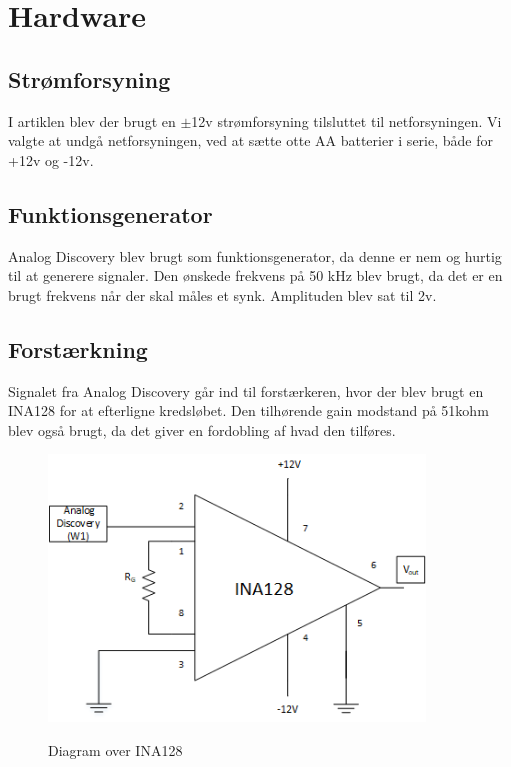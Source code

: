 \documentclass[main.tex]{subfiles}
\begin{document}
\section{Hardware}

\subsection{Strømforsyning}
I artiklen \cite{Aroom2009} blev der brugt en $\pm$12v strømforsyning tilsluttet til netforsyningen. Vi valgte at undgå netforsyningen, ved at sætte otte AA batterier i serie, både for +12v og -12v.


\subsection{Funktionsgenerator}
Analog Discovery blev brugt som funktionsgenerator, da denne er nem og hurtig til at generere signaler. Den ønskede frekvens på 50 kHz blev brugt, da det er en brugt frekvens når der skal måles et synk. Amplituden blev sat til 2v. \cite{Kusuhara2004ImpedanceFunction.}



\subsection{Forstærkning}
Signalet fra Analog Discovery går ind til forstærkeren, hvor der blev brugt en INA128 for at efterligne kredsløbet. Den tilhørende gain modstand på 51kohm blev også brugt, da det giver en fordobling af hvad den tilføres.

\begin{figure}[H]
\centering
{\includegraphics[width=10cm]
{Figure/ina128}}
\caption{Diagram over INA128}
\label{fig:12vbatteri}
\end{figure}
\end{document}
